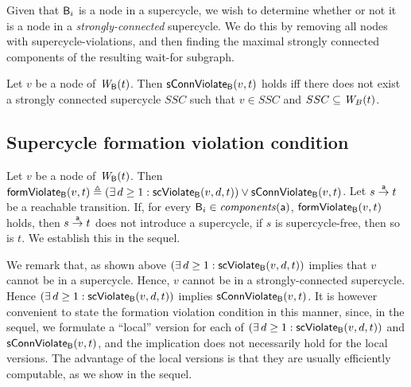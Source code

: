 Given that $\B_i$ is a node in a supercycle, we wish to determine whether or not it is a node in a
\emph{strongly-connected} supercycle. We do this by removing all nodes with supercycle-violations,
and then finding the maximal strongly connected components of the resulting wait-for subgraph.


\label{def:sConn.violation}
 Let $v$ be a node of $\wfg{\B}{t}$.   Then $\connViol{v}{t}$ holds iff there does not exist a strongly connected
 supercycle $SSC$ such that $v \in SSC$ and $SSC \sub \wfg{B}{t}$.
\ed




\subsection{Supercycle formation violation condition}

\label{def:formation.violation}
Let $v$ be a node of $\wfg{\B}{t}$.
Then $\formViol{v}{t}  \df (\exs d \ge 1: \scViol{v}{d}{t}) \lor \connViol{v}{t}$.
\ed
%
Let $s \goesto[\act] t$ be a reachable transition. If, for every $\B_i \in \cmps{\act}$, 
$\formViol{v}{t}$ holds, then $s \goesto[\act] t$ does not introduce a supercycle, \ie if $s$ is
supercycle-free, then so is $t$. We establish this in the sequel.

We remark that, as shown above $(\exs d \ge 1: \scViol{v}{d}{t})$
implies that $v$ cannot be in a supercycle. Hence, $v$ cannot be in a strongly-connected supercycle. 
Hence $(\exs d \ge 1: \scViol{v}{d}{t})$ implies $\connViol{v}{t}$. It is however convenient to state the formation
violation condition in this manner, since, in the sequel, we formulate a ``local'' version for each of  
$(\exs d \ge 1: \scViol{v}{d}{t})$ and $\connViol{v}{t}$, and the implication does not necessarily hold for the local
versions. The advantage of the local versions is that they are usually efficiently computable, as we show in the sequel.
